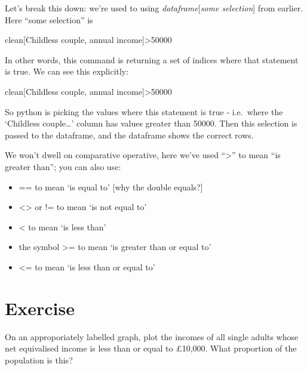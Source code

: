 \documentclass[
  letterpaper,
  DIV=11,
  numbers=noendperiod]{scrreprt}
\newenvironment{Shaded}{\begin{snugshade}}{\end{snugshade}}
\newcommand{\DecValTok}[1]{\textcolor[rgb]{0.68,0.00,0.00}{#1}}
\newcommand{\NormalTok}[1]{\textcolor[rgb]{0.00,0.23,0.31}{#1}}
\newcommand{\OperatorTok}[1]{\textcolor[rgb]{0.37,0.37,0.37}{#1}}
\newcommand{\StringTok}[1]{\textcolor[rgb]{0.13,0.47,0.30}{#1}}
\providecommand{\tightlist}{%
  \setlength{\itemsep}{0pt}\setlength{\parskip}{0pt}}\usepackage{longtable,booktabs,array}
\begin{document}
Let's break this down: we're used to using \emph{dataframe}{[}\emph{some
selection}{]} from earlier. Here ``some selection'' is

\begin{Shaded}
\begin{Highlighting}[]
\NormalTok{clean[}\StringTok{\textquotesingle{}Childless couple, annual income\textquotesingle{}}\NormalTok{]}\OperatorTok{\textgreater{}}\DecValTok{50000}
\end{Highlighting}
\end{Shaded}

In other words, this command is returning a set of indices where that
statement is true. We can see this explicitly:

\begin{Shaded}
\begin{Highlighting}[]
\NormalTok{clean[}\StringTok{\textquotesingle{}Childless couple, annual income\textquotesingle{}}\NormalTok{]}\OperatorTok{\textgreater{}}\DecValTok{50000}
\end{Highlighting}
\end{Shaded}

So python is picking the values where this statement is true -
i.e.~where the `Childless couple\ldots{}' column has values greater than
50000. Then this selection is passed to the dataframe, and the dataframe
shows the correct rows.

We won't dwell on comparative operative, here we've used
``\textgreater{}'' to mean ``is greater than''; you can also use:

\begin{itemize}
\tightlist
\item
  == to mean `is equal to' {[}why the double equals?{]}
\item
  \textless\textgreater{} or != to mean `is not equal to'
\item
  \textless{} to mean `is less than'
\item
  the symbol \textgreater= to mean `is greater than or equal to'
\item
  \textless= to mean `is less than or equal to'
\end{itemize}

\hypertarget{exercise-2}{%
\section{Exercise}\label{exercise-2}}

On an approporiately labelled graph, plot the incomes of all single
adults whose net equivalised income is less than or equal to £10,000.
What proportion of the population is this?
\end{document}
